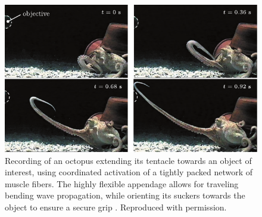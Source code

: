 \begin{figure}
  \centering
  \includegraphics*[width = .75\textwidth]{./pdf/thesis-figure-1-1.pdf}
  \caption{\small Recording of an octopus extending its tentacle towards an object of interest, using coordinated activation of a tightly packed network of muscle fibers. The highly flexible appendage allows for traveling bending wave propagation, while orienting its suckers towards the object to ensure a secure grip \cite{Sumbre2001Sep}. Reproduced with permission. \label{fig:C0:octopus}}
  \vspace{-8mm}
\end{figure}

\vspace*{-3mm}
